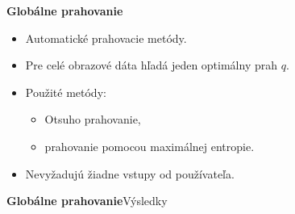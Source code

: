 \documentclass{beamer}
\begin{document}
\begin{frame}{\textbf{Globálne prahovanie}}
	\begin{itemize}
	\item Automatické prahovacie metódy.
		\vspace{2mm}

	\item Pre celé obrazové dáta hľadá jeden optimálny prah $q$.
		\vspace{2mm}

	\item Použité metódy: 
			\begin{itemize}
			\item Otsuho prahovanie,
			\item prahovanie pomocou maximálnej entropie.
			\end{itemize}
	\vspace{2mm}
	\item Nevyžadujú žiadne vstupy od používateľa.
	\end{itemize}
\end{frame}

\begin{frame}{\textbf{Globálne prahovanie}}{Výsledky}
	\begin{figure}
	\centering
	  \qquad
      	  \qquad
	\end{figure}
\end{frame}
\end{document}
